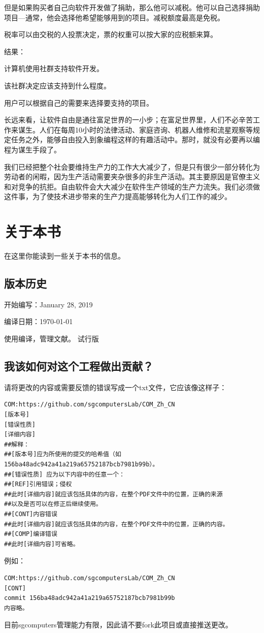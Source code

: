 \documentclass{book}
\begin{document}
但是如果购买者自己向软件开发做了捐助，那么他可以减税。他可以自己选择捐助项目—通常，他会选择他希望能够用到的项目。减税额度最高是免税。\par
税率可以由交税的人投票决定，票的权重可以按大家的应税额来算。\par
结果：\par
计算机使用社群支持软件开发。\par
该社群决定应该支持到什么程度。\par
用户可以根据自己的需要来选择要支持的项目。\par
长远来看，让软件自由是通往富足世界的一小步；在富足世界里，人们不必辛苦工作来谋生。人们在每周10小时的法律活动、家庭咨询、机器人维修和流星观察等规定任务之外，能够自由投入到象编程这样的有趣活动中。那时，就没有必要再以编程为谋生手段了。\par
我们已经把整个社会要维持生产力的工作大大减少了，但是只有很少一部分转化为劳动者的闲暇，因为生产活动需要夹杂很多的非生产活动。其主要原因是官僚主义和对竞争的抗拒。自由软件会大大减少在软件生产领域的生产力流失。我们必须做这件事，为了使技术进步带来的生产力提高能够转化为人们工作的减少。
\chapter{关于本书}
在这里你能读到一些关于本书的信息。
\section{版本历史}
开始编写：January 28, 2019\par
编译日期：\today \par
使用\XeLaTeX 编译，\BIBTEX 管理文献。
试行版
\section{我该如何对这个工程做出贡献？}
请将更改的内容或需要反馈的错误写成一个txt文件，它应该像这样子：
\begin{verbatim}
COM:https://github.com/sgcomputersLab/COM_Zh_CN
[版本号]
[错误性质]
[详细内容]
##解释：
##[版本号]应为所使用的提交的哈希值（如156ba48adc942a41a219a65752187bcb7981b99b）。
##[错误性质] 应为以下内容中的任意一个：
##[REF]引用错误；侵权
##此时[详细内容]就应该包括具体的内容，在整个PDF文件中的位置，正确的来源
##以及是否可以在修正后继续使用。
##[CONT]内容错误
##此时[详细内容]就应该包括具体的内容，在整个PDF文件中的位置，正确的内容。
##[COMP]编译错误
##此时[详细内容]可省略。
\end{verbatim}
例如：
\begin{verbatim}
COM:https://github.com/sgcomputersLab/COM_Zh_CN
[CONT]
commit 156ba48adc942a41a219a65752187bcb7981b99b
内容略。
\end{verbatim}
目前sgcomputers管理能力有限，因此请不要fork此项目或直接推送更改。
\end{document}
